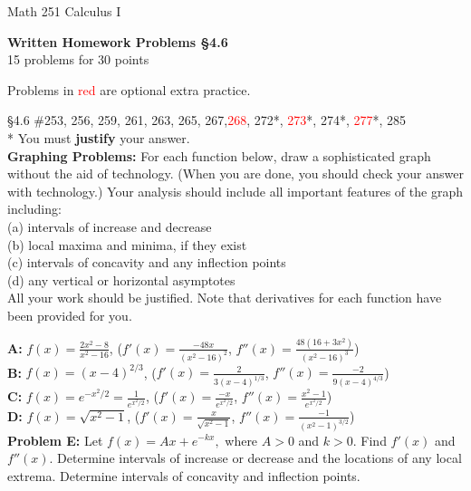 \documentclass[11pt]{report}
\theoremstyle{plain}
\newcommand{\opt}[1]{\textcolor{red}{#1}}
\begin{document}
\hfill Math 251 Calculus I
\begin{center}
\Large{\textbf{Written Homework Problems \S 4.6}} \\
15 problems for 30 points\\
\end{center}

Problems in \textcolor{red}{red} are optional extra practice.\\


\begin{description}
\item{\S 4.6} \#{253}, 256, 259, 261, 263, 265, 267,\opt{268}, 272*, \opt{273}*, 274*, \opt{277}*, 285\\

* You must \textbf{justify} your answer.\\

\textbf{Graphing Problems:} For each function below, draw a sophisticated graph without the aid of technology. (When you are done, you should check your answer with technology.) Your analysis should include all important features of the graph including:\\
(a) intervals of increase and decrease\\
(b) local maxima and minima, if they exist\\
(c) intervals of concavity and any inflection points\\
(d) any vertical or horizontal asymptotes\\

All your work should be justified. Note that derivatives for each function have been provided for you.

\textbf{A:} $\displaystyle f(x)=\frac{2x^2-8}{x^2-16}$, \quad ($\displaystyle f'(x)=\frac{-48x}{(x^2-16)^2}$,  \quad $\displaystyle f''(x)=\frac{48(16+3x^2)}{(x^2-16)^3}$)  \\
\textbf{B:} $\displaystyle f(x)=(x-4)^{2/3}$,  \quad  ($\displaystyle f'(x)=\frac{2}{3(x-4)^{1/3}}$,  \quad $\displaystyle f''(x)=\frac{-2}{9(x-4)^{4/3}}$)\\
\textbf{C:} $\displaystyle f(x)=e^{-x^2/2}=\frac{1}{e^{x^2/2}}$,  \quad  ($\displaystyle f'(x)=\frac{-x}{e^{x^2/2}}$,  \quad $\displaystyle f''(x)=\frac{x^2-1}{e^{x^2/2}}$)\\
\textbf{D:} $\displaystyle f(x)=\sqrt{x^2-1}$,  \quad ($\displaystyle f'(x)=\frac{x}{\sqrt{x^2-1}}$, \quad  $\displaystyle f''(x)=\frac{-1}{(x^2-1)^{3/2}}$) \\


\textbf{Problem E:} Let $f(x)=Ax+e^{-kx},$ where $A>0$ and $k>0.$ Find $f'(x)$ and $f''(x).$ Determine intervals of increase or decrease and the locations of any local extrema. Determine intervals of concavity and inflection points.




\end{description}
\end{document}
